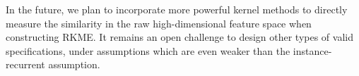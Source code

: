 \documentclass[paper=letter, fontsize=20pt]{article}
\begin{document}
In the future, we plan to incorporate more powerful kernel methods to directly measure the similarity in the raw high-dimensional feature space when constructing RKME. It remains an open challenge to design other types of valid specifications, under assumptions which are even weaker than the instance-recurrent assumption.


\end{document}
